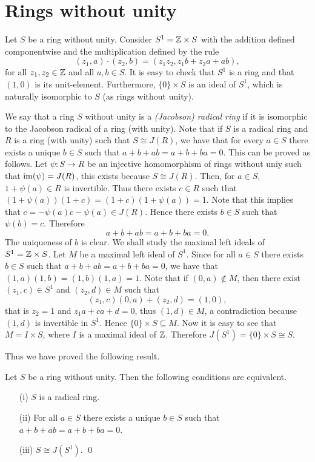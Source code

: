 \section{Rings without unity}

Let $S$ be a ring without unity. Consider $S^1=\mathbb{Z}\times S$ with the addition defined componentwise and the multiplication defined by
the rule
$$(z_1,a)\cdot (z_2,b)=(z_1z_2,z_1b+z_2a+ab),
$$
for all $z_1,z_2\in\mathbb{Z}$ and all $a,b\in S$. It is easy to check that $S^1$ is a ring and that $(1,0)$ is its unit-element. Furthermore, 
$\{0\}\times S$ is an ideal of $S^1$, which is naturally isomorphic to $S$ (as rings without unity).

We say that a ring $S$ without unity is a \emph{(Jacobson) radical ring} if it is isomorphic to the Jacobson radical of a ring (with unity). Note that if $S$ is a radical ring and $R$ is a ring (with unity) such that $S\cong J(R)$, we have that for every $a\in S$ there exists a unique $b\in S$ such that $a+b+ab=a+b+ba=0$. This can be proved as follows. Let $\psi\colon S\rightarrow R$ be an injective homomorphism of rings without uniy such that $\operatorname{im}(\psi)=J(R)$, this exists because $S\cong J(R)$. Then, for $a\in S$,
$1+\psi(a)\in R$ is invertible. Thus there exists $c\in R$ such that $(1+\psi(a))(1+c)=(1+c)(1+\psi(a))=1$. Note that this implies that
$c=-\psi(a)c-\psi(a)\in J(R)$. Hence there exists $b\in S$ such that $\psi(b)=c$. Therefore 
$$a+b+ab=a+b+ba=0.$$ 
The uniqueness of $b$ is clear. 
We shall study the  maximal left ideals of $S^1=\mathbb{Z}\times S$. Let $M$ be a maximal left ideal of $S^1$. Since for all $a\in S$ there exists $b\in S$ such that $a+b+ab=a+b+ba=0$, we have that $(1,a)(1,b)=(1,b)(1,a)=1$.
Note that if $(0,a)\notin M$, then there exist $(z_1,c)\in S^1$ and $(z_2,d)\in M$ such that
$$(z_1,c)(0,a)+(z_2,d)=(1,0),$$
that is $z_2=1$ and $z_1a+ca+d=0$, thus $(1,d)\in M$, a contradiction because $(1,d)$ is invertible in $S^1$. Hence $\{0\}\times S\subseteq M$. Now it is easy to see that $M=I\times S$, where $I$ is a maximal ideal of $\mathbb{Z}$. Therefore
$J(S^1)=\{0\}\times S\cong S$. 

Thus we have proved the following result.
\begin{proposition}\label{Prop5.1}
	Let $S$ be a ring without unity. Then the following conditions are equivalent.
	\begin{itemize}
		\item[(i)] $S$ is a radical ring.
		\item[(ii)] For all $a\in S$ there exists a unique $b\in S$ such that $a+b+ab=a+b+ba=0$.
		\item[(iii)] $S\cong J(S^1)$. \qed 
	\end{itemize}
	\end{proposition}  

